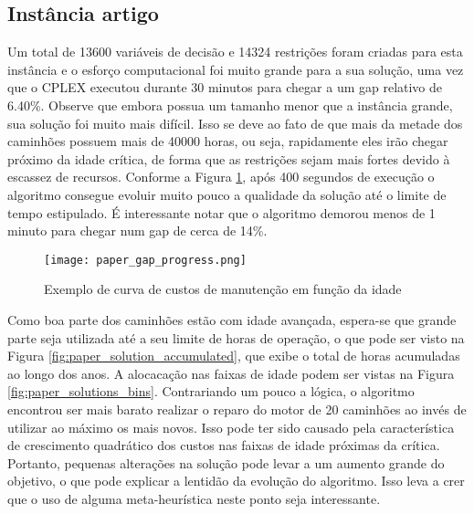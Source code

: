 \documentclass[conference]{IEEEtran}
\begin{document}


\subsection{Instância artigo}

Um total de 13600 variáveis de decisão e 14324 restrições foram criadas para esta instância e o esforço computacional foi muito grande para a sua solução, uma vez que o CPLEX executou durante 30 minutos para chegar a um gap relativo de 6.40\%. Observe que embora possua um tamanho menor que a instância grande, sua solução foi muito mais difícil. Isso se deve ao fato de que mais da metade dos caminhões possuem mais de 40000 horas, ou seja, rapidamente eles irão chegar próximo da idade crítica, de forma que as restrições sejam mais fortes devido à escassez de recursos. Conforme a Figura \ref{fig:paper_gap_progress}, após 400 segundos de execução o algoritmo consegue evoluir muito pouco a qualidade da solução até o limite de tempo estipulado. É interessante notar que o algoritmo demorou menos de 1 minuto para chegar num gap de cerca de 14\%.

\begin{figure}[h!]
	\centering
	\texttt{[image: paper\_gap\_progress.png]}
	\caption{Exemplo de curva de custos de manutenção em função da idade}
	\label{fig:paper_gap_progress}
\end{figure}

Como boa parte dos caminhões estão com idade avançada, espera-se que grande parte seja utilizada até a seu limite de horas de operação, o que pode ser visto na Figura \ref{fig:paper_solution_accumulated}, que exibe o total de horas acumuladas ao longo dos anos. A alocacação nas faixas de idade podem ser vistas na Figura \ref{fig:paper_solutions_bins}. Contrariando um pouco a lógica, o algoritmo encontrou ser mais barato realizar o reparo do motor de 20 caminhões ao invés de utilizar ao máximo os mais novos. Isso pode ter sido causado pela característica de crescimento quadrático dos custos nas faixas de idade próximas da crítica. Portanto, pequenas alterações na solução pode levar a um aumento grande do objetivo, o que pode explicar a lentidão da evolução do algoritmo. Isso leva a crer que o uso de alguma meta-heurística neste ponto seja interessante.
\end{document}
